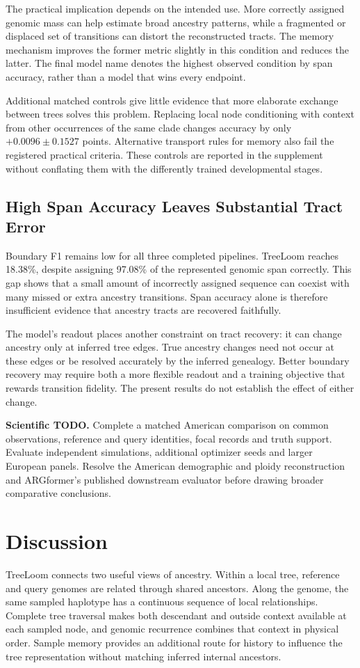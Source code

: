 \documentclass[letterpaper]{article}
\newcommand{\todo}[1]{\par\noindent\textbf{Scientific TODO.} #1\par}
\begin{document}
The practical implication depends on the intended use. More correctly assigned genomic mass can help estimate broad ancestry patterns, while a fragmented or displaced set of transitions can distort the reconstructed tracts. The memory mechanism improves the former metric slightly in this condition and reduces the latter. The final model name denotes the highest observed condition by span accuracy, rather than a model that wins every endpoint.

Additional matched controls give little evidence that more elaborate exchange between trees solves this problem. Replacing local node conditioning with context from other occurrences of the same clade changes accuracy by only $+0.0096\pm0.1527$ points. Alternative transport rules for memory also fail the registered practical criteria. These controls are reported in the supplement without conflating them with the differently trained developmental stages.

\subsection{High Span Accuracy Leaves Substantial Tract Error}
Boundary F1 remains low for all three completed pipelines. TreeLoom reaches 18.38\%, despite assigning 97.08\% of the represented genomic span correctly. This gap shows that a small amount of incorrectly assigned sequence can coexist with many missed or extra ancestry transitions. Span accuracy alone is therefore insufficient evidence that ancestry tracts are recovered faithfully.

The model's readout places another constraint on tract recovery: it can change ancestry only at inferred tree edges. True ancestry changes need not occur at these edges or be resolved accurately by the inferred genealogy. Better boundary recovery may require both a more flexible readout and a training objective that rewards transition fidelity. The present results do not establish the effect of either change.

\todo{Complete a matched American comparison on common observations, reference and query identities, focal records and truth support. Evaluate independent simulations, additional optimizer seeds and larger European panels. Resolve the American demographic and ploidy reconstruction and ARGformer's published downstream evaluator before drawing broader comparative conclusions.}

\section{Discussion}
TreeLoom connects two useful views of ancestry. Within a local tree, reference and query genomes are related through shared ancestors. Along the genome, the same sampled haplotype has a continuous sequence of local relationships. Complete tree traversal makes both descendant and outside context available at each sampled node, and genomic recurrence combines that context in physical order. Sample memory provides an additional route for history to influence the tree representation without matching inferred internal ancestors.
\end{document}
